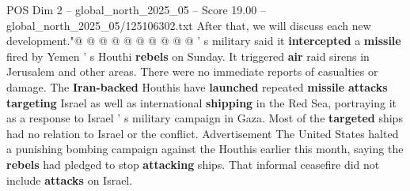 \begin{textsample}{POS Dim 2 – global\_north\_2025\_05 – Score 19.00 – global\_north\_2025\_05/125106302.txt}
After that, we will discuss each new development."@ @ @ @ @ @ @ @ @ @ ' s military said it \textbf{intercepted} a \textbf{missile} fired by Yemen ' s Houthi \textbf{rebels} on Sunday.
It triggered \textbf{air} raid sirens in Jerusalem and other areas.
There were no immediate reports of casualties or damage.
The \textbf{Iran-backed} Houthis have \textbf{launched} repeated \textbf{missile} \textbf{attacks} \textbf{targeting} Israel as well as international \textbf{shipping} in the Red Sea, portraying it as a response to Israel ' s military campaign in Gaza.
Most of the \textbf{targeted} ships had no relation to Israel or the conflict.
Advertisement The United States halted a punishing bombing campaign against the Houthis earlier this month, saying the \textbf{rebels} had pledged to stop \textbf{attacking} ships.
That informal ceasefire did not include \textbf{attacks} on Israel.

\end{textsample}
